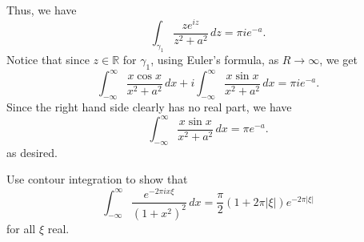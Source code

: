 \documentclass[12 pt, letterpaper]{hmcpset}
\begin{document}
\begin{solution}
	Thus, we have
	\[
		\int_{\gamma_{1}} \frac{z e^{iz}}{z^{2} + a^{2}} \, dz = \pi i e^{-a}.
	\]
	Notice that since $z \in \mathbb{R}$ for $\gamma_{1}$, using Euler's formula, as $R \to \infty$, we get
	\[
		\int_{-\infty}^{\infty} \frac{x \cos{x}}{x^{2} + a^{2}} \, dx + i \int_{-\infty} ^{\infty}\frac{x \sin{x}}{x^{2} + a^{2}} \, dx = \pi i e^{-a}.
	\]
	Since the right hand side clearly has no real part, we have
	\[
		\int_{-\infty}^{\infty} \frac{x \sin{x}}{x^{2} + a^{2}} \, dx = \pi e^{-a}.
	\]
	as desired.
\end{solution}

\pagebreak

\begin{problem}[5.]
	Use contour integration to show that
	\[
		\int_{-\infty}^{\infty} \frac{e^{- 2 \pi i x \xi}}{(1 + x^{2})^{2}} \, dx = \frac{\pi}{2} (1 + 2 \pi \lvert \xi \rvert) e^{- 2 \pi \lvert \xi \rvert}
	\]
	for all $\xi$ real.
\end{problem}
\end{document}
